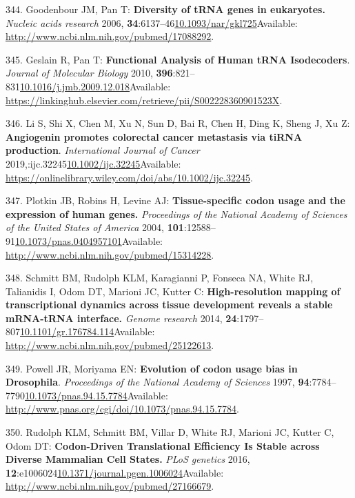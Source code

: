\documentclass[
]{book}
\begin{document}
\leavevmode\hypertarget{ref-Goodenbour2006}{}%
344. Goodenbour JM, Pan T: \textbf{Diversity of tRNA genes in eukaryotes.} \emph{Nucleic acids research} 2006, \textbf{34}:6137--46\href{https://doi.org/10.1093/nar/gkl725}{10.1093/nar/gkl725}Available: \url{http://www.ncbi.nlm.nih.gov/pubmed/17088292}.

\leavevmode\hypertarget{ref-Geslain2010}{}%
345. Geslain R, Pan T: \textbf{Functional Analysis of Human tRNA Isodecoders}. \emph{Journal of Molecular Biology} 2010, \textbf{396}:821--831\href{https://doi.org/10.1016/j.jmb.2009.12.018}{10.1016/j.jmb.2009.12.018}Available: \url{https://linkinghub.elsevier.com/retrieve/pii/S002228360901523X}.

\leavevmode\hypertarget{ref-Li2019}{}%
346. Li S, Shi X, Chen M, Xu N, Sun D, Bai R, Chen H, Ding K, Sheng J, Xu Z: \textbf{Angiogenin promotes colorectal cancer metastasis via tiRNA production}. \emph{International Journal of Cancer} 2019,:ijc.32245\href{https://doi.org/10.1002/ijc.32245}{10.1002/ijc.32245}Available: \url{https://onlinelibrary.wiley.com/doi/abs/10.1002/ijc.32245}.

\leavevmode\hypertarget{ref-Plotkin2004}{}%
347. Plotkin JB, Robins H, Levine AJ: \textbf{Tissue-specific codon usage and the expression of human genes.} \emph{Proceedings of the National Academy of Sciences of the United States of America} 2004, \textbf{101}:12588--91\href{https://doi.org/10.1073/pnas.0404957101}{10.1073/pnas.0404957101}Available: \url{http://www.ncbi.nlm.nih.gov/pubmed/15314228}.

\leavevmode\hypertarget{ref-Schmitt2014}{}%
348. Schmitt BM, Rudolph KLM, Karagianni P, Fonseca NA, White RJ, Talianidis I, Odom DT, Marioni JC, Kutter C: \textbf{High-resolution mapping of transcriptional dynamics across tissue development reveals a stable mRNA-tRNA interface.} \emph{Genome research} 2014, \textbf{24}:1797--807\href{https://doi.org/10.1101/gr.176784.114}{10.1101/gr.176784.114}Available: \url{http://www.ncbi.nlm.nih.gov/pubmed/25122613}.

\leavevmode\hypertarget{ref-Powell1997}{}%
349. Powell JR, Moriyama EN: \textbf{Evolution of codon usage bias in Drosophila}. \emph{Proceedings of the National Academy of Sciences} 1997, \textbf{94}:7784--7790\href{https://doi.org/10.1073/pnas.94.15.7784}{10.1073/pnas.94.15.7784}Available: \url{http://www.pnas.org/cgi/doi/10.1073/pnas.94.15.7784}.

\leavevmode\hypertarget{ref-Rudolph2016}{}%
350. Rudolph KLM, Schmitt BM, Villar D, White RJ, Marioni JC, Kutter C, Odom DT: \textbf{Codon-Driven Translational Efficiency Is Stable across Diverse Mammalian Cell States.} \emph{PLoS genetics} 2016, \textbf{12}:e1006024\href{https://doi.org/10.1371/journal.pgen.1006024}{10.1371/journal.pgen.1006024}Available: \url{http://www.ncbi.nlm.nih.gov/pubmed/27166679}.
\end{document}
